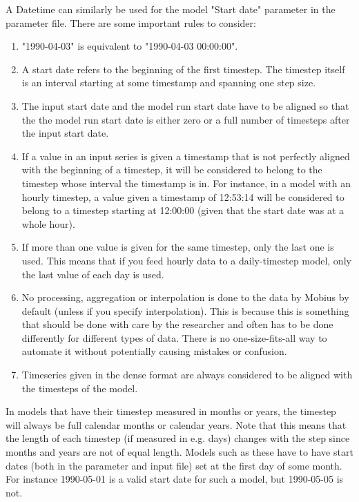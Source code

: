 \documentclass[11pt]{article}
\theoremstyle{definition}
\begin{document}
A Datetime can similarly be used for the model "Start date" parameter in the parameter file. There are some important rules to consider:
\begin{enumerate}[i]
\item "1990-04-03" is equivalent to "1990-04-03 00:00:00".
\item A start date refers to the beginning of the first timestep. The timestep itself is an interval starting at some timestamp and spanning one step size.
\item The input start date and the model run start date have to be aligned so that the the model run start date is either zero or a full number of timesteps after the input start date.
\item If a value in an input series is given a timestamp that is not perfectly aligned with the beginning of a timestep, it will be considered to belong to the timestep whose interval the timestamp is in. For instance, in a model with an hourly timestep, a value given a timestamp of 12:53:14 will be considered to belong to a timestep starting at 12:00:00 (given that the start date was at a whole hour).
\item If more than one value is given for the same timestep, only the last one is used. This means that if you feed hourly data to a daily-timestep model, only the last value of each day is used.
\item No processing, aggregation or interpolation is done to the data by Mobius by default (unless if you specify interpolation). This is because this is something that should be done with care by the researcher and often has to be done differently for different types of data. There is no one-size-fits-all way to automate it without potentially causing mistakes or confusion.
\item Timeseries given in the dense format are always considered to be aligned with the timesteps of the model.
\end{enumerate}

In models that have their timestep measured in months or years, the timestep will always be full calendar months or calendar years. Note that this means that the length of each timestep (if measured in e.g. days) changes with the step since months and years are not of equal length. Models such as these have to have start dates (both in the parameter and input file) set at the first day of some month. For instance 1990-05-01 is a valid start date for such a model, but 1990-05-05 is not.
\end{document}
